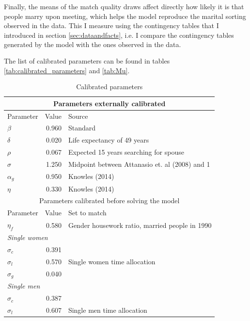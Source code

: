 \documentclass[12pt]{article}
\begin{document}
Finally, the means of the match quality draws affect directly how likely it is that people marry upon meeting, which helps the model reproduce the marital sorting observed in the data. This I measure using the contingency tables that I introduced in section \ref{sec:dataandfacts}, i.e. I compare the contingency tables generated by the model with the ones observed in the data. 

The list of calibrated parameters can be found in tables \ref{tab:calibrated_parameters} and \ref{tab:Mu}.


\begin{table}[htbp]
	\centering
	\caption{Calibrated parameters}
	\begin{tabular}{lll}
		\toprule
		\multicolumn{3}{c}{Parameters externally calibrated} \\
		\midrule
		Parameter & Value & Source \\
		\midrule
		$\beta$ & \multicolumn{1}{r}{0.960} & Standard \\
		$\delta$ & \multicolumn{1}{r}{0.020} & Life expectancy of 49 years \\
		$\rho$ & \multicolumn{1}{r}{0.067} & Expected 15 years searching for spouse \\
		$\sigma$ & \multicolumn{1}{r}{1.250} & Midpoint between Attanasio et. al (2008) and 1 \\
		$\alpha_g$ & \multicolumn{1}{r}{0.950} & Knowles (2014) \\
		$\eta$ & \multicolumn{1}{r}{0.330} & Knowles (2014) \\
		\midrule
		\multicolumn{3}{c}{Parameters calibrated before solving the model} \\
		\midrule
		Parameter & Value & Set to match \\
		\midrule
		$\eta_f$ & \multicolumn{1}{r}{0.580} & Gender housework ratio, married people in 1990 \\
		\multicolumn{2}{l}{\textit{Single women}} &  \\
		$\sigma_c$ & \multicolumn{1}{r}{0.391} &  \\
		$\sigma_l$ & \multicolumn{1}{r}{0.570} & Single women time allocation \\
		$\sigma_g$ & \multicolumn{1}{r}{0.040} &  \\
		\multicolumn{2}{l}{\textit{Single men}} &  \\
		$\sigma_c$ & \multicolumn{1}{r}{0.387} &  \\
		$\sigma_l$ & \multicolumn{1}{r}{0.607} & Single men time allocation \\

\end{tabular}
\end{table}
\end{document}
